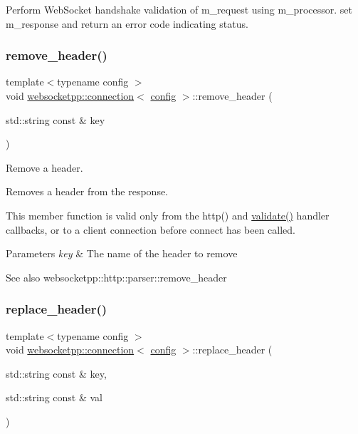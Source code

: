 Perform Web\+Socket handshake validation of m\+\_\+request using m\+\_\+processor. set m\+\_\+response and return an error code indicating status. \mbox{\label{classwebsocketpp_1_1connection_a63094895d9dcfb4d10974ae97ea319a1}} 
\subsubsection{\texorpdfstring{remove\+\_\+header()}{remove\_header()}}
{\footnotesize\ttfamily template$<$typename config $>$ \\
void \mbox{\hyperlink{classwebsocketpp_1_1connection}{websocketpp\+::connection}}$<$ \mbox{\hyperlink{classconfig}{config}} $>$\+::remove\+\_\+header (\begin{DoxyParamCaption}\item[{std\+::string const \&}]{key }\end{DoxyParamCaption})}



Remove a header. 

Removes a header from the response.

This member function is valid only from the http() and \mbox{\hyperlink{authority_8hpp_a98696231ed7d6f1c166797053cebc5eb}{validate()}} handler callbacks, or to a client connection before connect has been called.


\begin{DoxyParams}{Parameters}
{\em key} & The name of the header to remove \\
\hline
\end{DoxyParams}
\begin{DoxySeeAlso}{See also}
websocketpp\+::http\+::parser\+::remove\+\_\+header 
\end{DoxySeeAlso}
\mbox{\label{classwebsocketpp_1_1connection_a96e4adcdb9b3473ca96e2aac27ff7147}} 
\subsubsection{\texorpdfstring{replace\+\_\+header()}{replace\_header()}}
{\footnotesize\ttfamily template$<$typename config $>$ \\
void \mbox{\hyperlink{classwebsocketpp_1_1connection}{websocketpp\+::connection}}$<$ \mbox{\hyperlink{classconfig}{config}} $>$\+::replace\+\_\+header (\begin{DoxyParamCaption}\item[{std\+::string const \&}]{key,  }\item[{std\+::string const \&}]{val }\end{DoxyParamCaption})}



